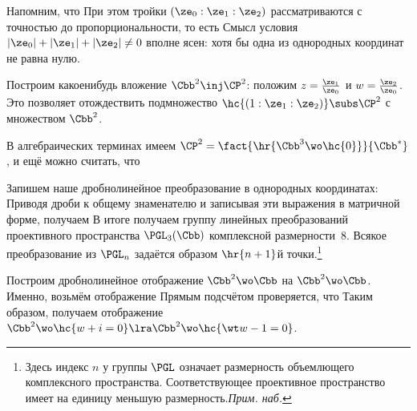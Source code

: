 \documentclass[a4paper]{article}
\begin{document}
Напомним, что
При этом тройки $(\ze_0:\ze_1:\ze_2)$ рассматриваются с точностью до пропорциональности, то есть
Смысл условия $|\ze_0| + |\ze_1| + |\ze_2| \neq 0$ вполне ясен: хотя бы одна из однородных
координат не равна нулю.

Построим какое\д нибудь вложение $\Cbb^2 \inj \CP^2$: положим
$z = \frac{\ze_1}{\ze_0}$ и $w = \frac{\ze_2}{\ze_0}$. Это позволяет отождествить
подмножество $\hc{(1:\ze_1:\ze_2)} \subs \CP^2$ с множеством $\Cbb^2$.

В алгебраических терминах имеем
$\CP^2 = \fact{\hr{\Cbb^3\wo\hc{0}}}{\Cbb^*}$, и ещё можно считать, что

Запишем наше дробно\д линейное преобразование в однородных координатах:
Приводя дроби к общему знаменателю и записывая эти выражения  в матричной форме, получаем
В итоге получаем группу линейных преобразований проективного пространства $\PGL_3(\Cbb)$
комплексной размерности~8. Всякое преобразование из $\PGL_n$ задаётся образом
$\hr{n+1}$\д й точки.\footnote{Здесь индекс $n$ у группы $\PGL$ означает размерность объемлющего
комплексного пространства. Соответствующее проективное пространство
имеет на единицу меньшую размерность.\т \emph{Прим. наб.}}

\medskip

Построим дробно\д линейное отображение $\Cbb^2 \wo \Cbb$ на $\Cbb^2 \wo \Cbb$.
Именно, возьмём отображение
Прямым подсчётом проверяется, что
Таким образом, получаем отображение $\Cbb^2 \wo \hc{w + i = 0} \lra \Cbb^2 \wo \hc{\wt w - 1 = 0}$.
\end{document}
